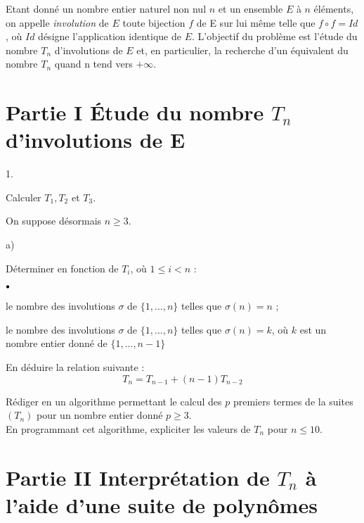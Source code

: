\documentclass[11pt]{article}%
\begin{document}
\noindent Etant donné un nombre entier naturel non nul $n$ et un
ensemble $E$
à $n$ éléments, on appelle \textit{involution} de $E$ toute bijection
$f$ de
E sur lui même telle que $f\circ f = Id$, où $Id$ désigne l'application
identique de $E$. L'objectif du problème est l'étude du nombre $T_{n}$
d'involutions de $E$ et, en particulier, la recherche d'un équivalent
du
nombre $T_{n}$ quand n tend vers $ + \infty $.

\section*{Partie I Étude du nombre $T_{n}$ d'involutions de E}

\begin{noliste}{1.}
 \setlength{\itemsep}{4mm}
\item Calculer $T_{1},T_{2}$ et $T_{3}$.

\item On suppose désormais $n\geq 3$.

\begin{noliste}{a)}
 \setlength{\itemsep}{2mm}
\item Déterminer en fonction de $T_{i}$, où $1\leq i<n$ :

\begin{noliste}{$\scriptstyle \bullet$}
\item le nombre des involutions $\sigma $ de ${\{}1,...,n{\}}$ telles
que $\sigma (n) = n$ ;

\item le nombre des involutions $\sigma $ de ${\{}1,...,n{\}}$ telles
que $\sigma (n) = k$, où $k$ est un nombre entier donné de
${\{}1,...,n-1{\}}$
\end{noliste}

\item En déduire la relation suivante : 
\begin{equation}
T_{n} = T_{n-1} + (n-1)T_{n-2} \label{1}
\end{equation}
\end{noliste}

\item Rédiger en \textsc{\Scilab{}} un algorithme permettant le calcul
des $p$
premiers termes de la suites $(T_{n})$ pour un nombre entier donné
$p\geq 3$.\\
En programmant cet algorithme, expliciter les valeurs de $T_{n}$ pour
$n\leq 10$.
\end{noliste}

\section*{Partie II Interprétation de $T_{n}$ à l'aide d'une suite de
polynômes}
\end{document}
